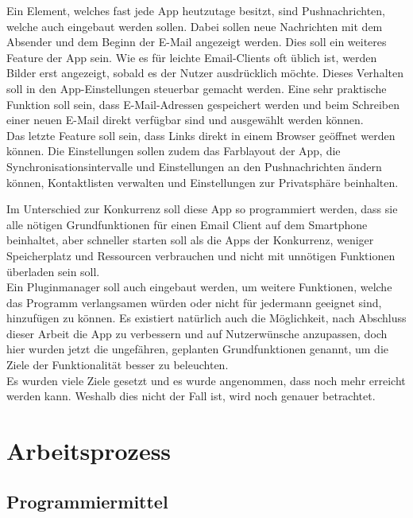 \documentclass[a4paper,11pt]{article}
\begin{document}
Ein Element, welches fast jede App heutzutage besitzt, sind Pushnachrichten, welche auch eingebaut werden sollen. Dabei sollen neue Nachrichten mit dem Absender und dem Beginn der E-Mail angezeigt werden. 
Dies soll ein weiteres Feature der App sein. Wie es für leichte Email-Clients oft üblich ist, werden Bilder erst angezeigt, sobald es der Nutzer ausdrücklich möchte. Dieses Verhalten soll in den App-Einstellungen steuerbar gemacht werden. Eine sehr praktische Funktion soll sein, dass E-Mail-Adressen gespeichert werden und beim Schreiben einer neuen E-Mail direkt verfügbar sind und ausgewählt werden können. %
\\

Das letzte Feature soll sein, dass Links direkt in einem Browser geöffnet werden können. Die Einstellungen sollen zudem das Farblayout der App, die Synchronisationsintervalle und Einstellungen an den Pushnachrichten ändern können, Kontaktlisten verwalten und Einstellungen zur Privatsphäre beinhalten.


Im Unterschied zur Konkurrenz soll diese App so programmiert werden, dass sie alle nötigen Grundfunktionen für einen Email Client auf dem Smartphone beinhaltet, aber schneller starten soll als die Apps der Konkurrenz, weniger Speicherplatz und Ressourcen verbrauchen und nicht mit unnötigen Funktionen überladen sein soll.\\


Ein Pluginmanager soll auch eingebaut werden, um weitere Funktionen, welche das Programm verlangsamen würden oder nicht für jedermann geeignet sind, hinzufügen zu können. Es existiert natürlich auch die Möglichkeit, nach Abschluss dieser Arbeit die App zu verbessern und auf Nutzerwünsche anzupassen, doch hier wurden jetzt die ungefähren, geplanten Grundfunktionen genannt, um die Ziele der Funktionalität besser zu beleuchten.\\
Es wurden viele Ziele gesetzt und es wurde angenommen, dass noch mehr erreicht werden kann. Weshalb dies nicht der Fall ist, wird noch genauer betrachtet.

\newpage

\section{Arbeitsprozess}

\subsection{Programmiermittel}
\end{document}
